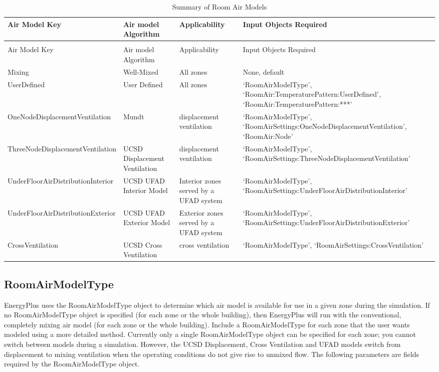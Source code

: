 {\scriptsize
\begin{longtable}[c]{p{1.5in}p{1.5in}p{1.5in}p{1.5in}}
\caption{Summary of Room Air Models \label{table:summary-of-room-air-models}} \tabularnewline
\toprule 
Air Model Key & Air model Algorithm & Applicability & Input Objects Required \tabularnewline
\midrule
\endfirsthead

\caption[]{Summary of Room Air Models} \tabularnewline
\toprule 
Air Model Key & Air model Algorithm & Applicability & Input Objects Required \tabularnewline
\midrule
\endhead

Mixing & Well-Mixed & All zones & None, default \tabularnewline
UserDefined & User Defined & All zones & `Room\-Air\-Model\-Type', `Room\-Air:\-Temperature\-Pattern:\-User\-Defined', `Room\-Air:\-Temperature\-Pattern:***' \tabularnewline
One\-Node\-Displacement\-Ventilation & Mundt & displacement ventilation & `Room\-Air\-Model\-Type', `Room\-Air\-Settings:\-One\-Node\-Displacement\-Ventilation', `Room\-Air:Node' \tabularnewline
Three\-Node\-Displacement\-Ventilation & UCSD Displacement Ventilation & displacement ventilation & `Room\-Air\-Model\-Type', `Room\-Air\-Settings:\-Three\-Node\-Displacement\-Ventilation' \tabularnewline
Under\-Floor\-Air\-Distribution\-Interior & UCSD UFAD Interior Model & Interior zones served by a UFAD system & `Room\-Air\-Model\-Type', `Room\-Air\-Settings:\-Under\-Floor\-Air\-Distribution\-Interior' \tabularnewline
Under\-Floor\-Air\-Distribution\-Exterior & UCSD UFAD Exterior Model & Exterior zones served by a UFAD system & `Room\-Air\-Model\-Type', `Room\-Air\-Settings:\-Under\-Floor\-Air\-Distribution\-Exterior' \tabularnewline
Cross\-Ventilation & UCSD Cross Ventilation & cross ventilation & `Room\-Air\-Model\-Type', `Room\-Air\-Settings:\-Cross\-Ventilation' \tabularnewline
\bottomrule
\end{longtable}
}

\subsection{RoomAirModelType}\label{roomairmodeltype}

EnergyPlus uses the Room\-Air\-Model\-Type object to determine which air model is available for use in a given zone during the simulation. If no Room\-Air\-Model\-Type object is specified (for each zone or the whole building), then EnergyPlus will run with the conventional, completely mixing air model (for each zone or the whole building). Include a Room\-Air\-Model\-Type for each zone that the user wants modeled using a more detailed method. Currently only a single Room\-Air\-Model\-Type object can be specified for each zone; you cannot switch between models during a simulation. However, the UCSD Displacement, Cross Ventilation and UFAD models switch from displacement to mixing ventilation when the operating conditions do not give rise to unmixed flow. The following parameters are fields required by the Room\-Air\-Model\-Type object.

